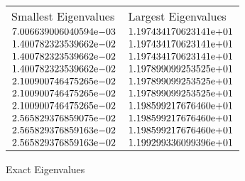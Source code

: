 \begin{enumerate}
\begin{figure}[tbh]
 \centering    
\begin{tabular}{ ||p{6cm}||p{6cm}|}
\hline
 Smallest Eigenvalues & Largest Eigenvalues \\ \hhline{|=|=|}    
\hline
${7.006639006040594}\mathrm{e}{-03}$ & ${1.197434170623141}\mathrm{e}{+01}$ \\  
${1.400782323539662}\mathrm{e}{-02}$ & ${1.197434170623141}\mathrm{e}{+01}$ \\  
${1.400782323539662}\mathrm{e}{-02}$ & ${1.197434170623141}\mathrm{e}{+01}$ \\  
${1.400782323539662}\mathrm{e}{-02}$ & ${1.197899099253525}\mathrm{e}{+01}$ \\  
${2.100900746475265}\mathrm{e}{-02}$ & ${1.197899099253525}\mathrm{e}{+01}$ \\  
${2.100900746475265}\mathrm{e}{-02}$ & ${1.197899099253525}\mathrm{e}{+01}$ \\  
${2.100900746475265}\mathrm{e}{-02}$ & ${1.198599217676460}\mathrm{e}{+01}$ \\  
${2.565829376859075}\mathrm{e}{-02}$ & ${1.198599217676460}\mathrm{e}{+01}$ \\  
${2.565829376859163}\mathrm{e}{-02}$ & ${1.198599217676460}\mathrm{e}{+01}$ \\  
${2.565829376859163}\mathrm{e}{-02}$ & ${1.199299336099396}\mathrm{e}{+01}$ \\  
\hline  
\end{tabular} 
\caption{Exact Eigenvalues}
   \label{tab:exact_64}
\end{figure} 

\end{enumerate}